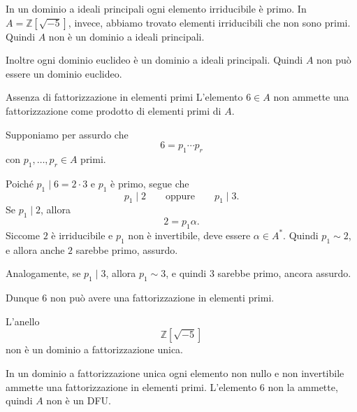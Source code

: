 \documentclass[a4paper]{article}
\begin{document}
\begin{radioactive}
\begin{snippetproof}{}
    In un dominio a ideali principali ogni elemento irriducibile è primo.
    In \(A=\mathbb{Z}[\sqrt{-5}]\), invece, abbiamo trovato elementi irriducibili che non sono primi.
    Quindi \(A\) non è un dominio a ideali principali.

    Inoltre ogni dominio euclideo è un dominio a ideali principali.
    Quindi \(A\) non può essere un dominio euclideo.
\end{snippetproof}
\end{radioactive}

\begin{radioactive}
\begin{snippetproposition}{Assenza di fattorizzazione in elementi primi}
    L'elemento \(6\in A\) non ammette una fattorizzazione come prodotto di elementi primi di \(A\).
\end{snippetproposition}
\end{radioactive}

\begin{radioactive}
\begin{snippetproof}{}
    Supponiamo per assurdo che
    \[
        6=p_1\cdots p_r
    \]
    con \(p_1,\ldots,p_r\in A\) primi.

    Poiché \(p_1\mid 6=2\cdot 3\) e \(p_1\) è primo, segue che
    \[
        p_1\mid 2
        \qquad
        \text{oppure}
        \qquad
        p_1\mid 3.
    \]
    Se \(p_1\mid 2\), allora
    \[
        2=p_1\alpha.
    \]
    Siccome \(2\) è irriducibile e \(p_1\) non è invertibile, deve essere \(\alpha\in A^\ast\).
    Quindi \(p_1\sim 2\), e allora anche \(2\) sarebbe primo, assurdo.

    Analogamente, se \(p_1\mid 3\), allora \(p_1\sim 3\), e quindi \(3\) sarebbe primo, ancora assurdo.

    Dunque \(6\) non può avere una fattorizzazione in elementi primi.
\end{snippetproof}
\end{radioactive}

\begin{radioactive}
\begin{snippetcorollary}{}
    L'anello
    \[
        \mathbb{Z}[\sqrt{-5}]
    \]
    non è un dominio a fattorizzazione unica.
\end{snippetcorollary}
\end{radioactive}

\begin{radioactive}
\begin{snippetproof}{}
    In un dominio a fattorizzazione unica ogni elemento non nullo e non invertibile ammette una fattorizzazione in elementi primi.
    L'elemento \(6\) non la ammette, quindi \(A\) non è un DFU.
\end{snippetproof}
\end{radioactive}
\end{document}
